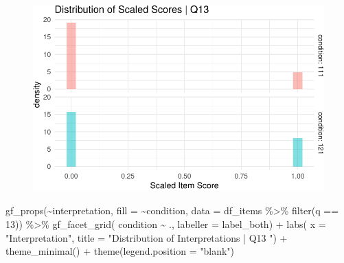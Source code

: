 \documentclass[
  letterpaper,
  DIV=11,
  numbers=noendperiod]{scrreprt}
\newenvironment{Shaded}{\begin{snugshade}}{\end{snugshade}}
\newcommand{\AttributeTok}[1]{\textcolor[rgb]{0.40,0.45,0.13}{#1}}
\newcommand{\DecValTok}[1]{\textcolor[rgb]{0.68,0.00,0.00}{#1}}
\newcommand{\FunctionTok}[1]{\textcolor[rgb]{0.28,0.35,0.67}{#1}}
\newcommand{\NormalTok}[1]{\textcolor[rgb]{0.00,0.23,0.31}{#1}}
\newcommand{\SpecialCharTok}[1]{\textcolor[rgb]{0.37,0.37,0.37}{#1}}
\newcommand{\StringTok}[1]{\textcolor[rgb]{0.13,0.47,0.30}{#1}}
\begin{document}
\begin{figure}[H]

{\centering \includegraphics{analysis/SGC3A/2_sgc3A_scoring_files/figure-pdf/Q13-distribution-1.pdf}

}

\end{figure}

\begin{Shaded}
\begin{Highlighting}[]
\FunctionTok{gf\_props}\NormalTok{(}\SpecialCharTok{\textasciitilde{}}\NormalTok{interpretation, }\AttributeTok{fill =} \SpecialCharTok{\textasciitilde{}}\NormalTok{condition, }\AttributeTok{data =}\NormalTok{ df\_items }\SpecialCharTok{\%\textgreater{}\%} \FunctionTok{filter}\NormalTok{(q }\SpecialCharTok{==} \DecValTok{13}\NormalTok{)) }\SpecialCharTok{\%\textgreater{}\%}
  \FunctionTok{gf\_facet\_grid}\NormalTok{( condition }\SpecialCharTok{\textasciitilde{}}\NormalTok{ ., }\AttributeTok{labeller =}\NormalTok{ label\_both) }\SpecialCharTok{+} 
  \FunctionTok{labs}\NormalTok{( }\AttributeTok{x =} \StringTok{"Interpretation"}\NormalTok{, }\AttributeTok{title =} \StringTok{"Distribution of Interpretations | Q13 "}\NormalTok{) }\SpecialCharTok{+} 
  \FunctionTok{theme\_minimal}\NormalTok{() }\SpecialCharTok{+} \FunctionTok{theme}\NormalTok{(}\AttributeTok{legend.position =} \StringTok{"blank"}\NormalTok{)}
\end{Highlighting}
\end{Shaded}
\end{document}
